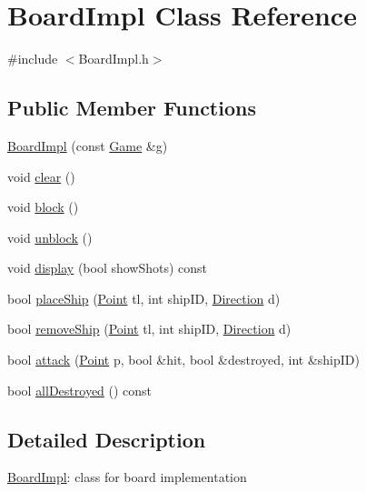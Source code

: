 \hypertarget{class_board_impl}{}\section{Board\+Impl Class Reference}
\label{class_board_impl}


{\ttfamily \#include $<$Board\+Impl.\+h$>$}

\subsection*{Public Member Functions}
\begin{DoxyCompactItemize}
\item 
\mbox{\hyperlink{class_board_impl_a2c3f1cce7def17781c0025d1e68d0af5}{Board\+Impl}} (const \mbox{\hyperlink{class_game}{Game}} \&g)
\item 
void \mbox{\hyperlink{class_board_impl_a47c7733ed5ec7a09fe9710f443fe0952}{clear}} ()
\item 
void \mbox{\hyperlink{class_board_impl_abd7743ed758876c2855b2bb7474cf2eb}{block}} ()
\item 
void \mbox{\hyperlink{class_board_impl_a36defeb0096154a4606442da9122c810}{unblock}} ()
\item 
void \mbox{\hyperlink{class_board_impl_a4b600b257cfe79f10ac8792ab69eb388}{display}} (bool show\+Shots) const
\item 
bool \mbox{\hyperlink{class_board_impl_af0fd0226fc1f401374a0cbbfbab98769}{place\+Ship}} (\mbox{\hyperlink{class_point}{Point}} tl, int ship\+ID, \mbox{\hyperlink{_globals_8h_a224b9163917ac32fc95a60d8c1eec3aa}{Direction}} d)
\item 
bool \mbox{\hyperlink{class_board_impl_a8573ccd5fb2a837f324cc0f190cece5d}{remove\+Ship}} (\mbox{\hyperlink{class_point}{Point}} tl, int ship\+ID, \mbox{\hyperlink{_globals_8h_a224b9163917ac32fc95a60d8c1eec3aa}{Direction}} d)
\item 
bool \mbox{\hyperlink{class_board_impl_afd58266f5c81679fef78c0d1abb9d0d5}{attack}} (\mbox{\hyperlink{class_point}{Point}} p, bool \&hit, bool \&destroyed, int \&ship\+ID)
\item 
bool \mbox{\hyperlink{class_board_impl_a00ae397df7ab1a47868078a2e0ec54b8}{all\+Destroyed}} () const
\end{DoxyCompactItemize}


\subsection{Detailed Description}
\mbox{\hyperlink{class_board_impl}{Board\+Impl}}\+: class for board implementation 

